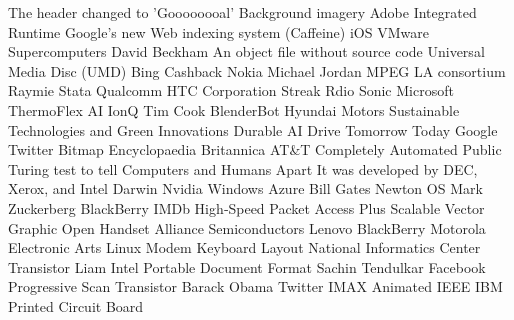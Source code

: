 \answerkey
{} The header changed to 'Goooooooal'
 Background imagery
 Adobe Integrated Runtime
 Google's new Web indexing system (Caffeine)
 iOS
 VMware
 Supercomputers
 David Beckham
 An object file without source code
 Universal Media Disc (UMD)
 Bing Cashback
 Nokia
 Michael Jordan
 MPEG LA consortium
 Raymie Stata
 Qualcomm
 HTC Corporation
 Streak
 Rdio
 Sonic
 Microsoft
 ThermoFlex AI
 IonQ
 Tim Cook
 BlenderBot
 Hyundai Motors
 Sustainable Technologies and Green Innovations
 Durable AI
 Drive Tomorrow Today
 Google
 Twitter
 Bitmap
 Encyclopaedia Britannica
 AT&T
 Completely Automated Public Turing test to tell Computers and Humans Apart
 It was developed by DEC, Xerox, and Intel
 Darwin
 Nvidia
 Windows Azure
 Bill Gates
 Newton OS
 Mark Zuckerberg
 BlackBerry
 IMDb
 High‑Speed Packet Access Plus
 Scalable Vector Graphic
 Open Handset Alliance
 Semiconductors
 Lenovo
 BlackBerry
 Motorola
 Electronic Arts
 Linux
 Modem
 Keyboard Layout
 National Informatics Center
 Transistor
 Liam
 Intel
 Portable Document Format
 Sachin Tendulkar
 Facebook
 Progressive Scan
 Transistor
 Barack Obama
 Twitter
 IMAX Animated
 IEEE
 IBM
 Printed Circuit Board
\endanswerkey